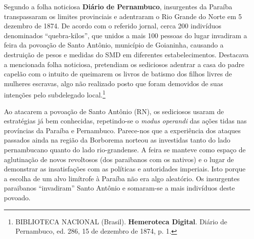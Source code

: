\begin{refsection}
Segundo a folha noticiosa \textbf{Diário de Pernambuco}, insurgentes da Paraíba transpassaram os limites provinciais e adentraram o Rio Grande do Norte em 5 dezembro de 1874. De acordo com o referido jornal, cerca 200 indivíduos denominados “quebra-kilos”, que unidos a mais 100 pessoas do lugar invadiram a feira da povoação de Santo Antônio, município de Goianinha, causando a destruição de pesos e medidas do SMD em diferentes estabelecimentos. Destacava a mencionada folha noticiosa, pretendiam os sediciosos adentrar a casa do padre capelão com o intuito de queimarem os livros de batismo dos filhos livres de mulheres escravas, algo não realizado posto que foram demovidos de suas intenções pelo subdelegado local.\footnote{BIBLIOTECA NACIONAL (Brasil). \textbf{Hemeroteca Digital}. Diário de Pernambuco, ed. 286, 15 de dezembro de 1874, p. 1.}

Ao atacarem a povoação de Santo Antônio (RN), os sediciosos usaram de estratégias já bem conhecidas, repetindo-se o \textit{modus operandi} das ações tidas nas províncias da Paraíba e Pernambuco. Parece-nos que a experiência dos ataques passados ainda na região da Borborema norteou as investidas tanto do lado pernambucano quanto do lado rio-grandense. A feira se manteve como espaço de aglutinação de novos revoltosos (dos paraibanos com os nativos) e o lugar de demonstrar as insatisfações com as políticas e autoridades imperiais. Isto porque a escolha de um alvo limítrofe à Paraíba não era algo aleatório. Os insurgentes paraibanos “invadiram” Santo Antônio e somaram-se a mais indivíduos deste povoado.


\end{refsection}
